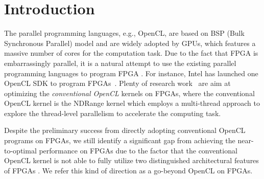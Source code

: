 \section{Introduction}

The parallel programming languages, e.g., OpenCL, are based on BSP (Bulk Synchronous Parallel) model and are widely adopted by GPUs, which features a massive number of cores for the computation task. 
Due to the fact that FPGA is embarrassingly parallel, it is a natural attempt to use the existing parallel programming languages to program FPGA . For instance, Intel has launched one OpenCL SDK to program FPGAs~\cite{altera_optimization}. Plenty of research work~\cite{flexcl_tc18, opencl_compiler_ERSA12, fpga_opencl_model_hpca16} are aim at optimizing the \emph{conventional OpenCL} kernels on FPGAs, where the conventional OpenCL kernel is the NDRange kernel which employs a multi-thread approach to explore the thread-level parallelism to accelerate the computing task. 



Despite the preliminary success from directly adopting conventional OpenCL programs on FPGAs, we still identify a significant gap from achieving the near-to-optimal performance on FPGAs due to the factor that the conventional OpenCL kernel is not able to fully utilize two distinguished architectural features of FPGAs . We refer this kind of direction as a go-beyond OpenCL on FPGAs. %

